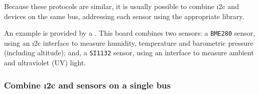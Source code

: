 Because these protocols are similar, it is usually possible to combine \i2c and \smbus devices on the same bus, addressing each sensor using the appropriate library.

An example is provided by a .
This board combines two sensors: a \texttt{BME280} sensor, using an \i2c interface to measure humidity, temperature and barometric pressure (including altitude); and, a \texttt{SI1132} sensor, using an \smbus interface to measure ambient and ultraviolet (UV) light.

\subsubsection{\howto Combine \i2c and \smbus sensors on a single bus}

